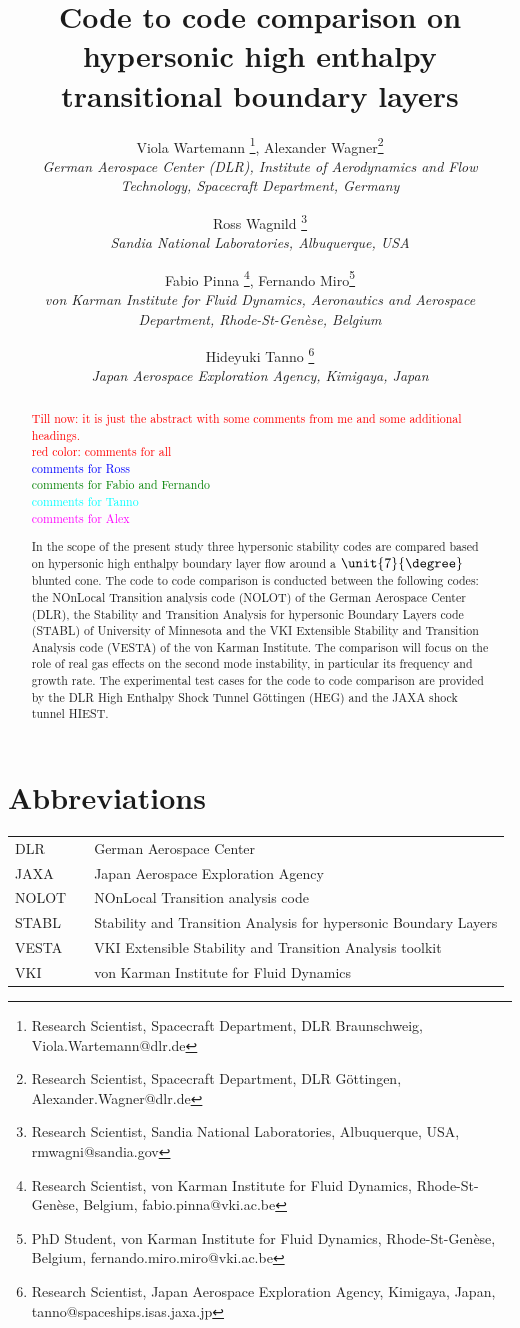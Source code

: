 \documentclass[]{aiaa-tc}%
\title{Code to code comparison on hypersonic high enthalpy transitional boundary layers}
\author{
  Viola Wartemann%
  \thanks{Research Scientist, Spacecraft Department, DLR Braunschweig, Viola.Wartemann@dlr.de}, Alexander Wagner\thanks{Research Scientist, Spacecraft Department, DLR G\"ottingen, Alexander.Wagner@dlr.de}\\
  {\normalsize\itshape
  German Aerospace Center (DLR), Institute of Aerodynamics and Flow Technology, Spacecraft Department, Germany} \\
  \and
  Ross Wagnild%
    \thanks{Research Scientist, Sandia National Laboratories, Albuquerque, USA, rmwagni@sandia.gov} \\
{\normalsize\itshape
  Sandia National Laboratories, Albuquerque, USA} \\
  \and
  Fabio Pinna%
    \thanks{Research Scientist, von Karman Institute for Fluid Dynamics, Rhode-St-Genèse, Belgium, fabio.pinna@vki.ac.be}, Fernando Miro\thanks{PhD Student, von Karman Institute for Fluid Dynamics, Rhode-St-Genèse, Belgium, fernando.miro.miro@vki.ac.be} \\   
{\normalsize\itshape
  von Karman Institute for Fluid Dynamics, Aeronautics and Aerospace Department, Rhode-St-Genèse, Belgium} \\
  \and
  Hideyuki Tanno%
    \thanks{Research Scientist, Japan Aerospace Exploration Agency, Kimigaya, Japan, tanno@spaceships.isas.jaxa.jp} \\
{\normalsize\itshape
 Japan Aerospace Exploration Agency, Kimigaya, Japan} \\
}
\begin{document}
\maketitle


\begin{abstract}

\textcolor{red}{Till now: it is just the abstract with some comments from me and some additional headings. \\ red color: comments for all}\\
\textcolor{blue}{comments for Ross}\\
\textcolor{green}{comments for Fabio and Fernando}\\
\textcolor{cyan}{comments for Tanno}\\
\textcolor{magenta}{comments for Alex}

In the scope of the present study three hypersonic stability codes are compared based on hypersonic high enthalpy boundary layer flow around a $\unit{7}{\degree}$ blunted cone. The code to code comparison is conducted between the following codes: the  NOnLocal Transition analysis code (NOLOT) of the German Aerospace Center (DLR), the Stability and Transition Analysis for hypersonic Boundary Layers code (STABL) of University of Minnesota and the VKI Extensible Stability and Transition Analysis code (VESTA) of the von Karman Institute. The comparison will focus on the role of real gas effects on the second mode instability, in particular its frequency and growth rate. The experimental test cases for the code to code comparison are provided by the DLR High Enthalpy Shock Tunnel G\"ottingen (HEG) and the JAXA shock tunnel HIEST.  

\end{abstract}


\section*{Abbreviations}
\begin{tabular}{lll}
DLR   &    &  German Aerospace Center \\
JAXA & &  Japan Aerospace Exploration Agency\\
NOLOT & & NOnLocal Transition analysis code\\
STABL & & Stability and Transition Analysis for hypersonic Boundary Layers\\
VESTA & & VKI Extensible Stability and Transition Analysis toolkit \\
VKI & &  von Karman Institute for Fluid Dynamics\\

\end{tabular}
\end{document}
